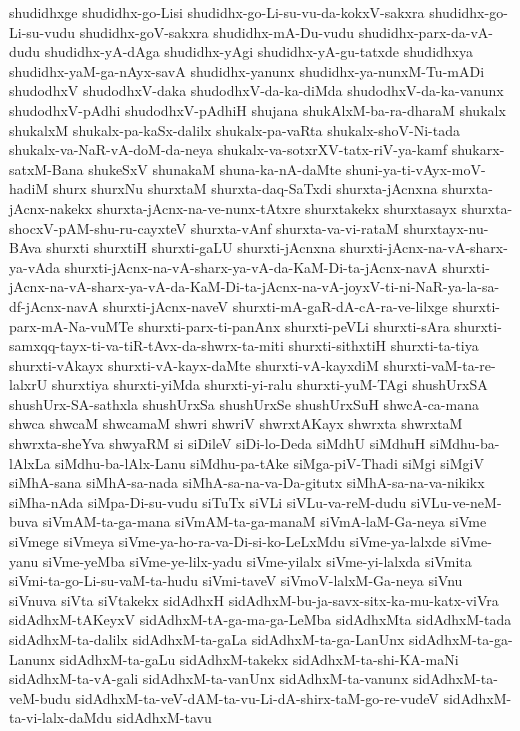 {shudidhxge
shudidhx-go-Lisi
shudidhx-go-Li-su-vu-da-kokxV-sakxra
shudidhx-go-Li-su-vudu
shudidhx-goV-sakxra
shudidhx-mA-Du-vudu
shudidhx-parx-da-vA-dudu
shudidhx-yA-dAga
shudidhx-yAgi
shudidhx-yA-gu-tatxde
shudidhxya
shudidhx-yaM-ga-nAyx-savA
shudidhx-yanunx
shudidhx-ya-nunxM-Tu-mADi
shudodhxV
shudodhxV-daka
shudodhxV-da-ka-diMda
shudodhxV-da-ka-vanunx
shudodhxV-pAdhi
shudodhxV-pAdhiH
shujana
shukAlxM-ba-ra-dharaM
shukalx
shukalxM
shukalx-pa-kaSx-dalilx
shukalx-pa-vaRta
shukalx-shoV-Ni-tada
shukalx-va-NaR-vA-doM-da-neya
shukalx-va-sotxrXV-tatx-riV-ya-kamf
shukarx-satxM-Bana
shukeSxV
shunakaM
shuna-ka-nA-daMte
shuni-ya-ti-vAyx-moV-hadiM
shurx
shurxNu
shurxtaM
shurxta-daq-SaTxdi
shurxta-jAcnxna
shurxta-jAcnx-nakekx
shurxta-jAcnx-na-ve-nunx-tAtxre
shurxtakekx
shurxtasayx
shurxta-shocxV-pAM-shu-ru-cayxteV
shurxta-vAnf
shurxta-va-vi-rataM
shurxtayx-nu-BAva
shurxti
shurxtiH
shurxti-gaLU
shurxti-jAcnxna
shurxti-jAcnx-na-vA-sharx-ya-vAda
shurxti-jAcnx-na-vA-sharx-ya-vA-da-KaM-Di-ta-jAcnx-navA
shurxti-jAcnx-na-vA-sharx-ya-vA-da-KaM-Di-ta-jAcnx-na-vA-joyxV-ti-ni-NaR-ya-la-sa-df-jAcnx-navA
shurxti-jAcnx-naveV
shurxti-mA-gaR-dA-cA-ra-ve-lilxge
shurxti-parx-mA-Na-vuMTe
shurxti-parx-ti-panAnx
shurxti-peVLi
shurxti-sAra
shurxti-samxqq-tayx-ti-va-tiR-tAvx-da-shwrx-ta-miti
shurxti-sithxtiH
shurxti-ta-tiya
shurxti-vAkayx
shurxti-vA-kayx-daMte
shurxti-vA-kayxdiM
shurxti-vaM-ta-re-lalxrU
shurxtiya
shurxti-yiMda
shurxti-yi-ralu
shurxti-yuM-TAgi
shushUrxSA
shushUrx-SA-sathxla
shushUrxSa
shushUrxSe
shushUrxSuH
shwcA-ca-mana
shwca
shwcaM
shwcamaM
shwri
shwriV
shwrxtAKayx
shwrxta
shwrxtaM
shwrxta-sheYva
shwyaRM
si
siDileV
siDi-lo-Deda
siMdhU
siMdhuH
siMdhu-ba-lAlxLa
siMdhu-ba-lAlx-Lanu
siMdhu-pa-tAke
siMga-piV-Thadi
siMgi
siMgiV
siMhA-sana
siMhA-sa-nada
siMhA-sa-na-va-Da-gitutx
siMhA-sa-na-va-nikikx
siMha-nAda
siMpa-Di-su-vudu
siTuTx
siVLi
siVLu-va-reM-dudu
siVLu-ve-neM-buva
siVmAM-ta-ga-mana
siVmAM-ta-ga-manaM
siVmA-laM-Ga-neya
siVme
siVmege
siVmeya
siVme-ya-ho-ra-va-Di-si-ko-LeLxMdu
siVme-ya-lalxde
siVme-yanu
siVme-yeMba
siVme-ye-lilx-yadu
siVme-yilalx
siVme-yi-lalxda
siVmita
siVmi-ta-go-Li-su-vaM-ta-hudu
siVmi-taveV
siVmoV-lalxM-Ga-neya
siVnu
siVnuva
siVta
siVtakekx
sidAdhxH
sidAdhxM-bu-ja-savx-sitx-ka-mu-katx-viVra
sidAdhxM-tAKeyxV
sidAdhxM-tA-ga-ma-ga-LeMba
sidAdhxMta
sidAdhxM-tada
sidAdhxM-ta-dalilx
sidAdhxM-ta-gaLa
sidAdhxM-ta-ga-LanUnx
sidAdhxM-ta-ga-Lanunx
sidAdhxM-ta-gaLu
sidAdhxM-takekx
sidAdhxM-ta-shi-KA-maNi
sidAdhxM-ta-vA-gali
sidAdhxM-ta-vanUnx
sidAdhxM-ta-vanunx
sidAdhxM-ta-veM-budu
sidAdhxM-ta-veV-dAM-ta-vu-Li-dA-shirx-taM-go-re-vudeV
sidAdhxM-ta-vi-lalx-daMdu
sidAdhxM-tavu
}
